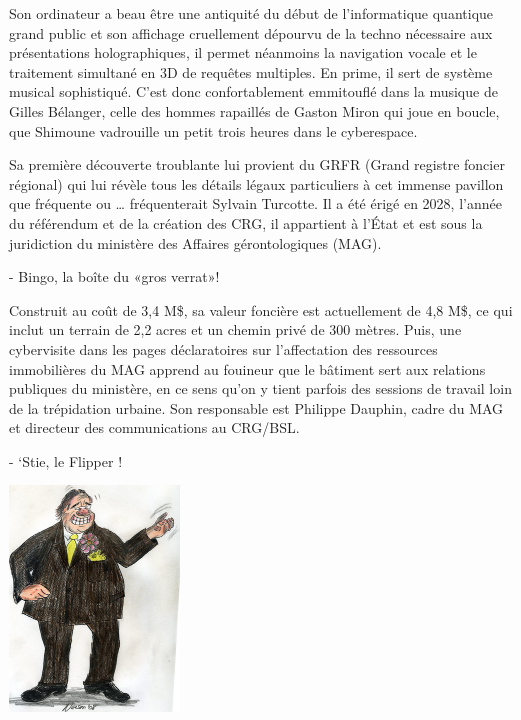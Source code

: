 Son ordinateur a beau être une antiquité du début de l’informatique quantique grand public et son affichage cruellement dépourvu de la techno nécessaire aux présentations holographiques, il permet néanmoins la navigation vocale et le traitement simultané en 3D de requêtes multiples. En prime, il sert de système musical sophistiqué. C’est donc confortablement emmitouflé dans la musique de Gilles Bélanger, celle des hommes rapaillés de Gaston Miron qui joue en boucle, que Shimoune vadrouille un petit trois heures dans le cyberespace.

Sa première découverte troublante lui provient du GRFR (Grand registre foncier régional) qui lui révèle tous les détails légaux particuliers à cet immense pavillon que fréquente ou … fréquenterait Sylvain Turcotte. Il a été érigé en 2028, l’année du référendum et de la création des CRG, il appartient à l’État et est sous la juridiction du ministère des Affaires gérontologiques (MAG).

- Bingo, la boîte du «gros verrat»!

Construit au coût de 3,4 M\$, sa valeur foncière est actuellement de 4,8 M\$, ce qui inclut un terrain de 2,2 acres et un chemin privé de 300 mètres. Puis, une cybervisite dans les pages déclaratoires sur l’affectation des ressources immobilières du MAG apprend au fouineur que le bâtiment sert aux relations publiques du ministère, en ce sens qu’on y tient parfois des sessions de travail loin de la trépidation urbaine. Son responsable est Philippe Dauphin, cadre du MAG et directeur des communications au CRG/BSL.

- ‘Stie, le Flipper !

\begin{floatingfigure}[l]{50mm}
\includegraphics[height=60mm]{corps/chapitre13/img/personnage-turcotte1.jpg}
\end{floatingfigure}

